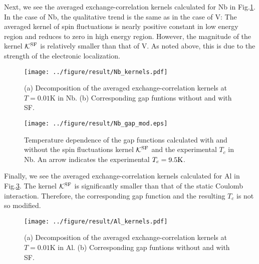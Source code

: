 Next, we see the averaged exchange-correlation kernels calculated for Nb in Fig.\ref{fig:Nbaveker}.
In the case of Nb, the qualitative trend is the same as in the case of V: The averaged kernel of spin fluctuations
is nearly positive constant in low energy region and reduces to zero in high energy region.
However, the magnitude of the kernel $\mathcal K^{\rm SF}$ is relatively smaller than that of V.
As noted above, this is due to the strength of the electronic localization.
%
\begin{figure}[h]
	\centering
	\texttt{[image: ../figure/result/Nb\_kernels.pdf]}
	\caption{(a) Decomposition of the averaged exchange-correlation kernels
		at $T=0.01$K in Nb. (b) Corresponding gap funtions without 
	and with SF.}
	\label{fig:Nbaveker}
\end{figure}
%
\begin{figure}[h]
	\centering
	\texttt{[image: ../figure/result/Nb\_gap\_mod.eps]}
	\caption{Temperature dependence of the gap functions calculated with and without 
		the spin fluctuations kernel $\mathcal K^{\rm SF}$ and the experimental $T_c$ in Nb.
		An arrow indicates the experimental $T_c = 9.5{\rm K}$.}
	\label{fig:NbgapT}
\end{figure}

Finally, we see the averaged exchange-correlation kernels calculated for Al in Fig.\ref{fig:Alaveker}.
The kernel $\mathcal K^{\rm SF}$ is significantly smaller than that of the static Coulomb interaction.
Therefore, the corresponding gap function and the resulting $T_c$ is not so modified.
%
%
\begin{figure}[h]
	\centering
	\texttt{[image: ../figure/result/Al\_kernels.pdf]}
	\caption{(a) Decomposition of the averaged exchange-correlation kernels
		at $T=0.01$K in Al. (b) Corresponding gap funtions without 
	and with SF.}
	\label{fig:Alaveker}
\end{figure}
%

